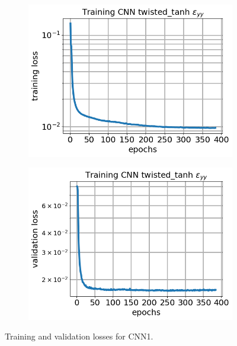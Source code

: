 \documentclass[10pt]{article}
\newcommand{\nhghalfwidth}{0.48\linewidth}
\newcommand{\nhgtotalheight}{4cm}
\begin{document}
\begin{figure}[!h]
  \centering
  \begin{subfigure}[c]{\nhghalfwidth}
    \centering
    \includegraphics[totalheight=\nhgtotalheight]{Figures/Results1/loss.png}
  \end{subfigure}
%  
  \begin{subfigure}[c]{\nhghalfwidth}
    \centering    
    \includegraphics[totalheight=\nhgtotalheight]{Figures/Results1/val_loss.png}
  \end{subfigure}
  \caption{\label{fig:cnn1losses} Training and validation losses for CNN1.}
\end{figure}
%
\end{document}

